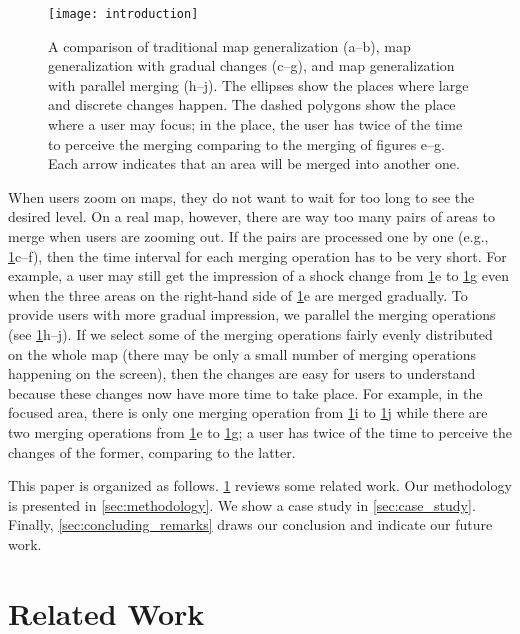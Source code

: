 \documentclass[ijgi,article,submit,moreauthors,pdftex]{Definitions/mdpi}
\begin{document}
\begin{figure}[tb]
\centering
\texttt{[image: introduction]}
\caption{A comparison of traditional map generalization (a--b),
map generalization with gradual changes (c--g),
and map generalization with parallel merging (h--j).
The ellipses show the places where large and discrete changes happen.
The dashed polygons show the place where a user may focus;
in the place, the user has twice of the time to perceive the merging
comparing to the merging of figures e--g.
Each arrow indicates that an area will be merged into another one. 
}
\label{fig:intro}
\end{figure}

When users zoom on maps, 
they do not want to wait for too long 
to see the desired level.
On a real map, however, 
there are way too many pairs of areas to merge 
when users are zooming out.
If the pairs are processed one by one 
(e.g., \fig\ref{fig:intro}c--f),
then the time interval for each merging operation has to be very short.
For example, a user may still get the impression of
a shock change from \fig\ref{fig:intro}e to \fig\ref{fig:intro}g
even when the three areas on the right-hand side of \fig\ref{fig:intro}e
are merged gradually.
To provide users with more gradual impression, 
we parallel the merging operations
(see \fig\ref{fig:intro}h--j).
If we select some of the merging operations
fairly evenly distributed on the whole map 
(there may be only a small number of merging operations 
happening on the screen),
then the changes are easy for users to understand
because these changes now have more time to take place.
For example, in the focused area, there is only one merging operation 
from \fig\ref{fig:intro}i to \fig\ref{fig:intro}j
while there are two merging operations  
from \fig\ref{fig:intro}e to \fig\ref{fig:intro}g;
a user has twice of the time to perceive the changes of the former,
comparing to the latter.

This paper is organized as follows.
\sect\ref{sec:realted_work} reviews some related work.
Our methodology is presented in \sect\ref{sec:methodology}.
We show a case study in \sect\ref{sec:case_study}.
Finally, \sect\ref{sec:concluding_remarks} draws our conclusion
and indicate our future work.





 
\section{Related Work}
\label{sec:realted_work}
\end{document}
